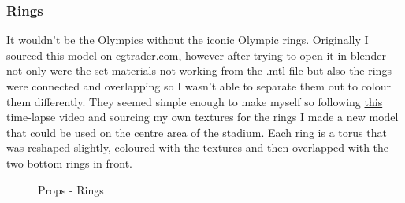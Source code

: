 \documentclass[a4 paper, 12pt]{article}
\begin{document}
\subsubsection{Rings}
It wouldn't be the Olympics without the iconic Olympic rings. Originally I sourced \href{https://www.cgtrader.com/free-3d-models/architectural/other/3d-olympic-rings}{this} model on cgtrader.com, however after trying to open it in blender not only were the set materials not working from the .mtl file but also the rings were connected and overlapping so I wasn't able to separate them out to colour them differently. They seemed simple enough to make myself so following \href{https://www.youtube.com/watch?v=yaWl43Z0QQk}{this} time-lapse video and sourcing my own textures for the rings I made a new model that could be used on the centre area of the stadium. Each ring is a torus that was reshaped slightly, coloured with the textures and then overlapped with the two bottom rings in front. 
    \begin{figure} [H]
        \caption{Props - Rings}   
    \end{figure}
\end{document}
